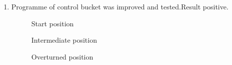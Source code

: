 \begin{enumerate}
\begin{enumerate}
        \item Programme of control bucket was improved and tested.Result positive.
        \begin{figure}[H]
	  	  \begin{minipage}[h]{0.31\linewidth}
	  	    \caption{Start position}
	  	  \end{minipage}
	  	  \hfill
	  	  \begin{minipage}[h]{0.31\linewidth}
	  		\caption{Intermediate position}
	  	  \end{minipage}
	  	  \hfill
	  	  \begin{minipage}[h]{0.31\linewidth}
	  	   	\caption{Overturned position}
	  	  \end{minipage}
	   \end{figure}


\end{enumerate}
\end{enumerate}
